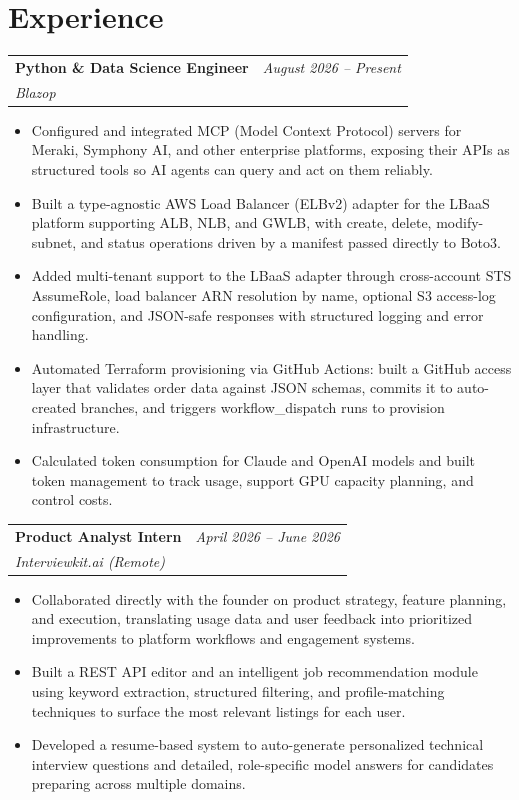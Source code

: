 \documentclass[letterpaper,8pt]{article}
\makeatletter
\newcommand{\resumeSubheading}[4]{
  \begin{tabular*}{\textwidth}{l @{\extracolsep{\fill}} r}
    \textbf{#1} & \small\textit{#2} \\
    \textit{\small#3} & \textit{\small #4} \\
  \end{tabular*}
}
\makeatother
\begin{document}
\vspace{-15pt}

\section{Experience}

\resumeSubheading{Python \& Data Science Engineer}{August 2026 -- Present}{Blazop}{}
\begin{itemize}
    \item Configured and integrated MCP (Model Context Protocol) servers for Meraki, Symphony AI, and other enterprise platforms, exposing their APIs as structured tools so AI agents can query and act on them reliably.
    \item Built a type-agnostic AWS Load Balancer (ELBv2) adapter for the LBaaS platform supporting ALB, NLB, and GWLB, with create, delete, modify-subnet, and status operations driven by a manifest passed directly to Boto3.
    \item Added multi-tenant support to the LBaaS adapter through cross-account STS AssumeRole, load balancer ARN resolution by name, optional S3 access-log configuration, and JSON-safe responses with structured logging and error handling.
    \item Automated Terraform provisioning via GitHub Actions: built a GitHub access layer that validates order data against JSON schemas, commits it to auto-created branches, and triggers workflow\_dispatch runs to provision infrastructure.
    \item Calculated token consumption for Claude and OpenAI models and built token management to track usage, support GPU capacity planning, and control costs.
\end{itemize}

\vspace{1pt}

\resumeSubheading{Product Analyst Intern}{April 2026 -- June 2026}{Interviewkit.ai (Remote)}{}
\begin{itemize}
    \item Collaborated directly with the founder on product strategy, feature planning, and execution, translating usage data and user feedback into prioritized improvements to platform workflows and engagement systems.
    \item Built a REST API editor and an intelligent job recommendation module using keyword extraction, structured filtering, and profile-matching techniques to surface the most relevant listings for each user.
    \item Developed a resume-based system to auto-generate personalized technical interview questions and detailed, role-specific model answers for candidates preparing across multiple domains.
\end{itemize}
\end{document}
